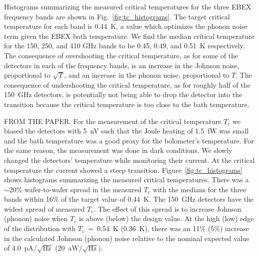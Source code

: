Histograms summarizing the measured critical temperatures for the three \ac{EBEX} frequency bands are shown in Fig.~\ref{fig:tc_histograms}. 
The target critical temperature for each band is 0.44~K, a value which optimizes the phonon noise term given the \ac{EBEX} bath temperature. %
We find the median critical temperature for the 150, 250, and 410 GHz bands to be 0.45, 0.49, and 0.51~K respectively.  
The consequence of overshooting the critical temperature, as for some of the detectors in each of the frequency bands, is an increase in the Johnson noise, proportional to $\sqrt{T}$, and an increase in the phonon noise, proportional to $T$. 
The consequence of undershooting the critical temperature, as for roughly half of the 150~GHz detectors, is potentially not being able to drop the detector into the transition because the critical temperature is too close to the bath temperature. %

FROM THE PAPER.
For the measurement of the critical temperature $T_{c}$ we biased the detectors with 5~nV such that the Joule heating of 1.5~fW was 
small and the bath temperature was a good proxy for the bolometer's temperature. For the same reason, the measurement was 
done in dark conditions. We slowly changed the detectors' temperature while monitoring their current. 
At the critical temperature the current showed a steep transition.
Figure~\ref{fig:tc_histograms} shows histograms summarizing the measured critical temperatures. There 
was a $\sim$20\% wafer-to-wafer spread in the measured $T_{c}$ with the medians for the three bands within 
16\% of the target value of 0.44~K. 
The 150~GHz detectors have the widest spread of measured $T_{c}$. The effect of this spread is to increase Johnson (phonon) 
noise when $T_{c}$ is above (below) the design value. 
At the high (low) edge of the distribution with $T_{c}$~=~0.54~K (0.36~K), there was an 11\% (5\%) increase in the calculated Johnson (phonon) noise 
relative to the nominal expected value of 4.0~pA/$\sqrt{\mathrm{Hz}}$ (20~aW/$\sqrt{\mathrm{Hz}}$). 




